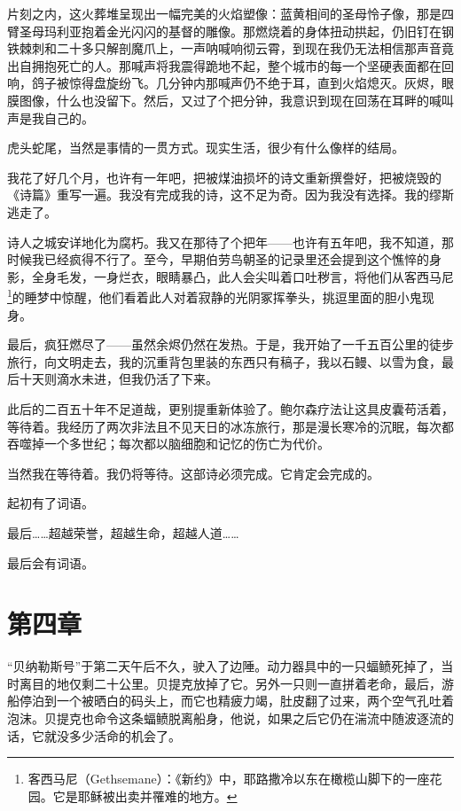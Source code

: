 \documentclass[AutoFakeBold=true]{book}
\begin{document}
片刻之内，这火葬堆呈现出一幅完美的火焰塑像：蓝黄相间的圣母怜子像，那是四臂圣母玛利亚抱着金光闪闪的基督的雕像。那燃烧着的身体扭动拱起，仍旧钉在钢铁棘刺和二十多只解剖魔爪上，一声呐喊响彻云霄，到现在我仍无法相信那声音竟出自拥抱死亡的人。那喊声将我震得跪地不起，整个城市的每一个坚硬表面都在回响，鸽子被惊得盘旋纷飞。几分钟内那喊声仍不绝于耳，直到火焰熄灭。灰烬，眼膜图像，什么也没留下。然后，又过了个把分钟，我意识到现在回荡在耳畔的喊叫声是我自己的。

\vspace*{1em}

虎头蛇尾，当然是事情的一贯方式。现实生活，很少有什么像样的结局。

我花了好几个月，也许有一年吧，把被煤油损坏的诗文重新撰誊好，把被烧毁的《诗篇》重写一遍。我没有完成我的诗，这不足为奇。因为我没有选择。我的缪斯逃走了。

诗人之城安详地化为腐朽。我又在那待了个把年——也许有五年吧，我不知道，那时候我已经疯得不行了。至今，早期伯劳鸟朝圣的记录里还会提到这个憔悴的身影，全身毛发，一身烂衣，眼睛暴凸，此人会尖叫着口吐秽言，将他们从客西马尼\footnote{客西马尼（Gethsemane）：《新约》中，耶路撒冷以东在橄榄山脚下的一座花园。它是耶稣被出卖并罹难的地方。}的睡梦中惊醒，他们看着此人对着寂静的光阴冢挥拳头，挑逗里面的胆小鬼现身。

最后，疯狂燃尽了——虽然余烬仍然在发热。于是，我开始了一千五百公里的徒步旅行，向文明走去，我的沉重背包里装的东西只有稿子，我以石鳗、以雪为食，最后十天则滴水未进，但我仍活了下来。

此后的二百五十年不足道哉，更别提重新体验了。鲍尔森疗法让这具皮囊苟活着，等待着。我经历了两次非法且不见天日的冰冻旅行，那是漫长寒冷的沉眠，每次都吞噬掉一个多世纪；每次都以脑细胞和记忆的伤亡为代价。

当然我在等待着。我仍将等待。这部诗必须完成。它肯定会完成的。

起初有了词语。

最后……超越荣誉，超越生命，超越人道……

最后会有词语。

\chapter{第四章}

``贝纳勒斯号''于第二天午后不久，驶入了边陲。动力器具中的一只蝠鲼死掉了，当时离目的地仅剩二十公里。贝提克放掉了它。另外一只则一直拼着老命，最后，游船停泊到一个被晒白的码头上，而它也精疲力竭，肚皮翻了过来，两个空气孔吐着泡沫。贝提克也命令这条蝠鲼脱离船身，他说，如果之后它仍在湍流中随波逐流的话，它就没多少活命的机会了。
\end{document}
